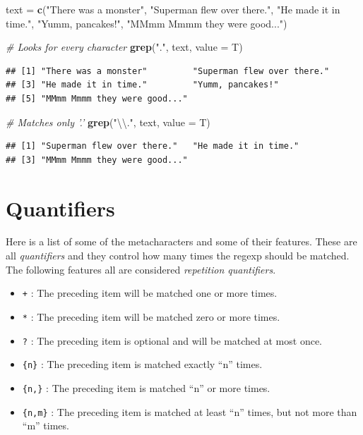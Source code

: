 \documentclass[
]{book}
\newenvironment{Shaded}{\begin{snugshade}}{\end{snugshade}}
\newcommand{\CharTok}[1]{\textcolor[rgb]{0.31,0.60,0.02}{#1}}
\newcommand{\CommentTok}[1]{\textcolor[rgb]{0.56,0.35,0.01}{\textit{#1}}}
\newcommand{\DataTypeTok}[1]{\textcolor[rgb]{0.13,0.29,0.53}{#1}}
\newcommand{\KeywordTok}[1]{\textcolor[rgb]{0.13,0.29,0.53}{\textbf{#1}}}
\newcommand{\NormalTok}[1]{#1}
\newcommand{\StringTok}[1]{\textcolor[rgb]{0.31,0.60,0.02}{#1}}
\providecommand{\tightlist}{%
  \setlength{\itemsep}{0pt}\setlength{\parskip}{0pt}}
\begin{document}
\begin{Shaded}
\begin{Highlighting}[]
\NormalTok{text =}\StringTok{ }\KeywordTok{c}\NormalTok{(}\StringTok{"There was a monster"}\NormalTok{, }\StringTok{"Superman flew over there."}\NormalTok{,}
    \StringTok{"He made it in time."}\NormalTok{, }\StringTok{"Yumm, pancakes!"}\NormalTok{, }\StringTok{"MMmm Mmmm they were good..."}\NormalTok{)}

\CommentTok{# Looks for every character}
\KeywordTok{grep}\NormalTok{(}\StringTok{"."}\NormalTok{, text, }\DataTypeTok{value =}\NormalTok{ T)}
\end{Highlighting}
\end{Shaded}

\begin{verbatim}
## [1] "There was a monster"         "Superman flew over there."  
## [3] "He made it in time."         "Yumm, pancakes!"            
## [5] "MMmm Mmmm they were good..."
\end{verbatim}

\begin{Shaded}
\begin{Highlighting}[]
\CommentTok{# Matches only '.'}
\KeywordTok{grep}\NormalTok{(}\StringTok{"}\CharTok{\textbackslash{}\textbackslash{}}\StringTok{."}\NormalTok{, text, }\DataTypeTok{value =}\NormalTok{ T)}
\end{Highlighting}
\end{Shaded}

\begin{verbatim}
## [1] "Superman flew over there."   "He made it in time."        
## [3] "MMmm Mmmm they were good..."
\end{verbatim}

\hypertarget{quantifiers}{%
\section{Quantifiers}\label{quantifiers}}

Here is a list of some of the metacharacters and some of their features. These are all \emph{quantifiers} and they control how many times the regexp should be matched. The following features all are considered \emph{repetition quantifiers}.

\begin{itemize}
\tightlist
\item
  \texttt{+} : The preceding item will be matched one or more times.
\item
  \texttt{*} : The preceding item will be matched zero or more times.
\item
  \texttt{?} : The preceding item is optional and will be matched at most once.
\item
  \texttt{\{n\}} : The preceding item is matched exactly ``n'' times.
\item
  \texttt{\{n,\}} : The preceding item is matched ``n'' or more times.
\item
  \texttt{\{n,m\}} : The preceding item is matched at least ``n'' times, but not more than ``m'' times.
\end{itemize}
\end{document}
